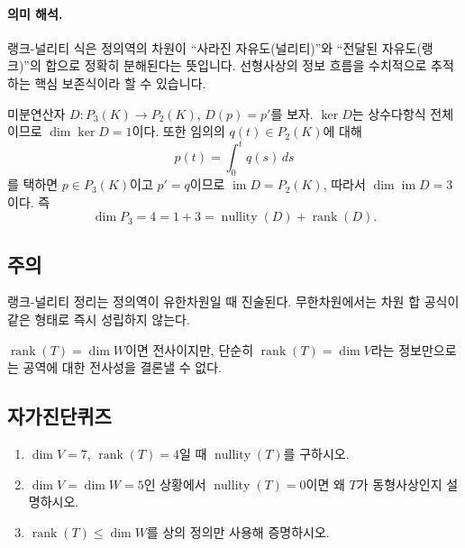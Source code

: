 \paragraph{의미 해석.}
랭크-널리티 식은 정의역의 차원이 ``사라진 자유도(널리티)''와 ``전달된 자유도(랭크)''의 합으로 정확히 분해된다는 뜻입니다. 선형사상의 정보 흐름을 수치적으로 추적하는 핵심 보존식이라 할 수 있습니다.

\begin{example}
미분연산자 $D:P_3(K)\to P_2(K)$, $D(p)=p'$를 보자.  
$\ker D$는 상수다항식 전체이므로 $\dim\ker D=1$이다. 또한 임의의 $q(t)\in P_2(K)$에 대해
\[
p(t)=\int_0^t q(s)\,ds
\]
를 택하면 $p\in P_3(K)$이고 $p'=q$이므로 $\operatorname{im}D=P_2(K)$, 따라서 $\dim\operatorname{im}D=3$이다.  
즉
\[
\dim P_3=4=1+3=\operatorname{nullity}(D)+\operatorname{rank}(D).
\]
\end{example}

\subsection*{주의}
\begin{warning}
랭크-널리티 정리는 정의역이 유한차원일 때 진술된다. 무한차원에서는 차원 합 공식이 같은 형태로 즉시 성립하지 않는다.
\end{warning}
\begin{warning}
$\operatorname{rank}(T)=\dim W$이면 전사이지만, 단순히 $\operatorname{rank}(T)=\dim V$라는 정보만으로는 공역에 대한 전사성을 결론낼 수 없다.
\end{warning}

\subsection*{자가진단퀴즈}
\begin{enumerate}[label=\arabic*.]
\item $\dim V=7$, $\operatorname{rank}(T)=4$일 때 $\operatorname{nullity}(T)$를 구하시오.
\item $\dim V=\dim W=5$인 상황에서 $\operatorname{nullity}(T)=0$이면 왜 $T$가 동형사상인지 설명하시오.
\item $\operatorname{rank}(T)\le \dim W$를 상의 정의만 사용해 증명하시오.
\end{enumerate}


